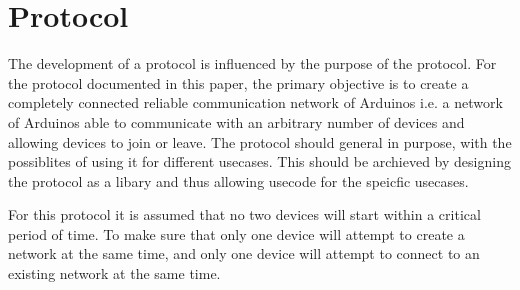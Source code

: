 \section{Protocol}
The development of a protocol is influenced by the purpose of the protocol.
For the protocol documented in this paper, the primary objective is to create a completely connected reliable communication network of Arduinos i.e. a network of Arduinos able to communicate with an arbitrary number of devices and allowing devices to join or leave.
The protocol should general in purpose, with the possiblites of using it for different usecases.
This should be archieved by designing the protocol as a libary and thus allowing usecode for the speicfic usecases.

For this protocol it is assumed that no two devices will start within a critical period of time.
To make sure that only one device will attempt to create a network at the same time, and only one device will attempt to connect to an existing network at the same time. 